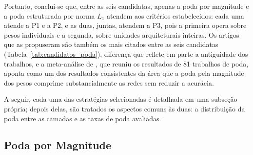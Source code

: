 Portanto, conclui-se que, entre as seis candidatas, apenas a poda por magnitude e a poda
estruturada por norma $L_1$ atendem aos critérios estabelecidos: cada uma atende a P1 e a
P2, e as duas, juntas, atendem a P3, pois a primeira opera sobre pesos individuais e a
segunda, sobre unidades arquiteturais inteiras. Os artigos que as propuseram são também os
mais citados entre as seis candidatas (Tabela~\ref{tab:candidatos_poda}), diferença que
reflete em parte a antiguidade dos trabalhos, e a meta-análise de ,
que reuniu os resultados de 81 trabalhos de poda, aponta como um dos resultados consistentes
da área que a poda pela magnitude dos pesos comprime substancialmente as redes sem reduzir a
acurácia.

A seguir, cada uma das estratégias selecionadas é detalhada em uma subseção própria; depois
delas, são tratados os aspectos comuns às duas: a distribuição da poda entre as camadas e
as taxas de poda avaliadas.

\subsection{Poda por Magnitude}\label{subsec:metodo_magnitude}

